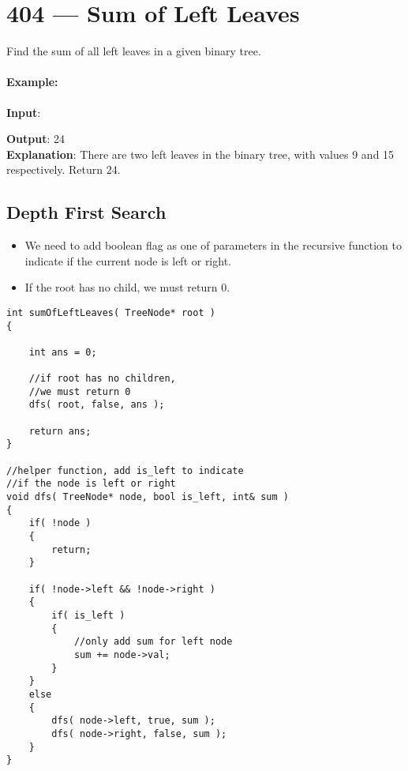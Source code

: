 \section{404 --- Sum of Left Leaves}
Find the sum of all left leaves in a given binary tree.

\paragraph{Example:}
\begin{flushleft}
\textbf{Input}:
\begin{figure}[H]
\end{figure}
\textbf{Output}: 24
\\
\textbf{Explanation}: There are two left leaves in the binary tree, with values 9 and 15 respectively. Return 24.
\end{flushleft}

\subsection{Depth First Search}
\begin{itemize}
\item We need to add boolean flag as one of parameters in the recursive function to indicate if the current node is left or right.
\item If the root has no child, we must return 0.
\end{itemize}

\setcounter{lstlisting}{0}
\begin{lstlisting}[style=customc, caption={Depth First Search}]
int sumOfLeftLeaves( TreeNode* root )
{

    int ans = 0;

    //if root has no children,
    //we must return 0
    dfs( root, false, ans );

    return ans;
}

//helper function, add is_left to indicate
//if the node is left or right
void dfs( TreeNode* node, bool is_left, int& sum )
{
    if( !node )
    {
        return;
    }

    if( !node->left && !node->right )
    {
        if( is_left )
        {
            //only add sum for left node
            sum += node->val;
        }
    }
    else
    {
        dfs( node->left, true, sum );
        dfs( node->right, false, sum );
    }
}
\end{lstlisting}


